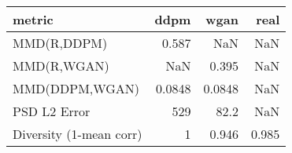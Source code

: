\begin{tabular}{lrrr}
\toprule
metric & ddpm & wgan & real \\
\midrule
MMD(R,DDPM) & 0.587 & NaN & NaN \\
MMD(R,WGAN) & NaN & 0.395 & NaN \\
MMD(DDPM,WGAN) & 0.0848 & 0.0848 & NaN \\
PSD L2 Error & 529 & 82.2 & NaN \\
Diversity (1-mean corr) & 1 & 0.946 & 0.985 \\
\bottomrule
\end{tabular}
